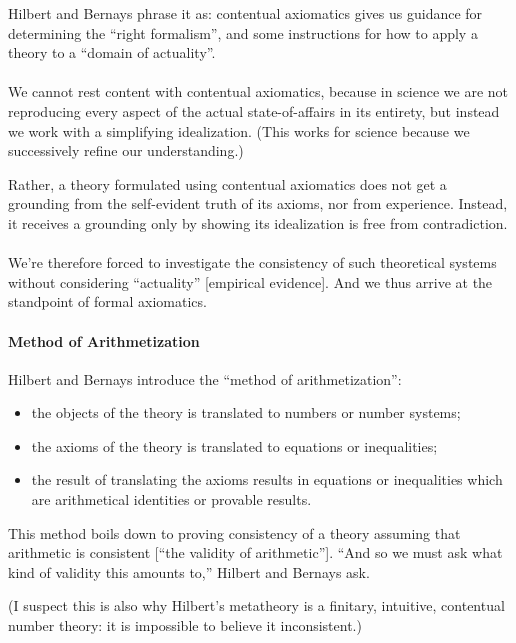 Hilbert and Bernays phrase it as: contentual axiomatics gives us
guidance for determining the ``right formalism'', and some
instructions for how to apply a theory to a ``domain of actuality''.

\paragraph{}
We cannot rest content with contentual axiomatics, because in science
we are not reproducing every aspect of the actual state-of-affairs in
its entirety, but instead we work with a simplifying
idealization. (This works for science because we successively refine
our understanding.)

Rather, a theory formulated using contentual axiomatics does not get a
grounding from the self-evident truth of its axioms, nor from
experience. Instead, it receives a grounding only by showing its
idealization is free from contradiction.

\paragraph{}
We're therefore forced to investigate the consistency of such
theoretical systems without considering ``actuality'' [empirical evidence].
And we thus arrive at the standpoint of formal axiomatics.

\paragraph{Method of Arithmetization}
Hilbert and Bernays introduce the ``method of arithmetization'':
\begin{itemize}
\item the objects of the theory is translated to numbers or number systems;
\item the axioms of the theory is translated to equations or inequalities;
\item the result of translating the axioms results in equations or
  inequalities which are arithmetical identities or provable results.
\end{itemize}
This method boils down to proving consistency of a theory assuming
that arithmetic is consistent [``the validity of arithmetic''].
``And so we must ask what kind of validity this amounts to,'' Hilbert and Bernays ask.

(I suspect this is also why Hilbert's metatheory is a finitary,
intuitive, contentual number theory: it is impossible to believe it
inconsistent.)

